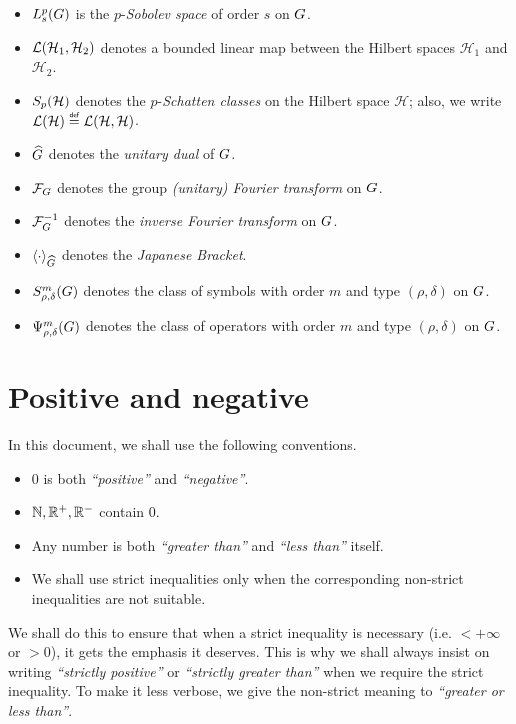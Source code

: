 \begin{itemize}
    \item $L^{p}_{s}(G)$ is the $p$-\emph{Sobolev space} of order $s$ on $G$.
    \item ${\mathcal{L} (\mathcal H_1, \mathcal H_2)}$ denotes a bounded linear map between the Hilbert spaces $\mathcal H_1$ and $\mathcal H_2$.
    \item $S_{p}(\mathcal H)$ denotes the $p$-\emph{Schatten classes} on the Hilbert space $\mathcal H$; also, we write $\Lin {\mathcal H} \defeq \Lin {\mathcal H, \mathcal H}$.
    \item ${\widehat{G}}$ denotes the \emph{unitary dual} of $G$.
    \item $\mathcal{F}_{G}$ denotes the group \emph{(unitary) Fourier transform} on $G$.
    \item $\mathcal{F}^{-1}_{G}$ denotes the \emph{inverse Fourier transform} on $G$.
    \item ${\langle \cdot \rangle}_{{\widehat{G}}}$ denotes the \emph{Japanese Bracket}.
    \item $S^{m}_{\rho, \delta}(G)$ denotes the class of symbols with order $m$ and type $(\rho, \delta)$ on $G$.
    \item $\Psi^{m}_{\rho, \delta}(G)$ denotes the class of operators with order $m$ and type $(\rho, \delta)$ on $G$.
\end{itemize}

\section*{Positive and negative}

In this document, we shall use the following conventions.

\begin{itemize}
    \item $0$ is both \emph{``positive''} and \emph{``negative''}.
    \item $\mathbb{N}, \mathbb{R}^+, \mathbb{R}^-$ contain $0$.
    \item Any number is both \emph{``greater than''} and \emph{``less than''} itself.
    \item We shall use strict inequalities only
        when the corresponding non-strict inequalities are not suitable.
\end{itemize}

We shall do this to ensure that
when a strict inequality is necessary (i.e. $< +\infty$ or $> 0$),
it gets the emphasis it deserves.
This is why we shall always insist on writing \emph{``strictly positive''} or \emph{``strictly greater than''} when we require the strict inequality.
To make it less verbose,
we give the non-strict meaning to \emph{``greater or less than''}.

